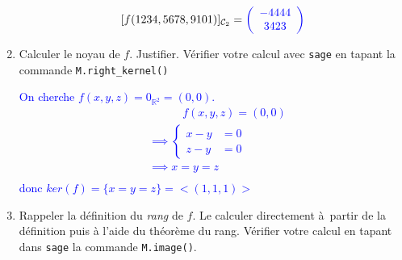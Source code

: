 \documentclass[a4paper,12pt]{article}
\def\R{\mathbb{R}}
\newcommand{\add}[1]{\textcolor{blue}{#1}}
\begin{document}
\begin{exercice}
\begin{enumerate}
            $$
            [f(1234,5678,9101)]_{\mathcal C_2} = 
            \add{
                \left(\begin{array}{c} -4444\\ 3423 \end{array}\right)
            }
            $$
            
        \item Calculer le noyau de $f$. Justifier. Vérifier votre calcul avec {\tt sage} en tapant la commande {\tt M.right\_kernel()}

            \add{
            On cherche $ f(x,y,z)=0_{\R^2}=(0,0) $.
            \begin{align*}
                &\quad\quad\quad f(x,y,z)=(0,0) \\
                &\implies
                \left\{
                \begin{aligned}
                    x-y&=0\\
                    z-y&=0
                \end{aligned} \right.\\
                &\implies
                x=y=z\\
            \end{align*}
            donc $ker(f)=\{x=y=z\}=<(1,1,1)>$
            }

       \item Rappeler la définition du \emph{rang} de $f$. Le calculer directement à partir de la définition puis à l'aide du théorème du rang. Vérifier votre calcul en tapant dans {\tt sage} la commande {\tt M.image()}.


\end{enumerate}
\end{exercice}
\end{document}
